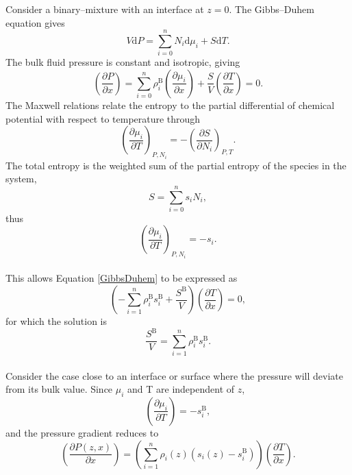 Consider a binary--mixture with an interface at $z=0$.
The Gibbs--Duhem equation gives
\begin{equation}
V \mathrm{d}P = \sum_{i=0}^{n} N_{i} \mathrm{d}\mu_{i} + S \mathrm{d}T.
\end{equation}
The bulk fluid pressure is constant and isotropic, giving
\begin{equation}
\label{GibbsDuhem}
\left( \frac{\partial P}{\partial x}\right) = \sum_{i=0}^{n} \rho_{i}^{\mathrm{B}} \left(\frac{\partial \mu_{i}}{\partial x}\right) + \frac{S}{V} \left( \frac{\partial T}{\partial x}\right) = 0.
\end{equation}
The Maxwell relations relate the entropy to the partial differential of chemical potential with respect to temperature through
\begin{equation}
\left( \frac{\partial\mu_{i}}{\partial T} \right)_{P,N_{i}} = - \left(\frac{\partial S}{\partial N_{i}}\right)_{P,T}.
\end{equation}
The total entropy is the weighted sum of the partial entropy of the species in the system, 
\begin{equation}
S = \sum_{i=0}^{n}s_{i}N_{i},
\end{equation}
thus
\begin{equation}
\left( \frac{\partial\mu_{i}}{\partial T} \right)_{P,N_{i}} = - s_{i}.
\end{equation}
\\
This allows Equation \ref{GibbsDuhem} to be expressed as
\begin{equation}
\left( - \sum_{i=1}^{n}\rho_{i}^{\mathrm{B}}s_{i}^{\mathrm{B}}+\frac{S^{\mathrm{B}}}{V}\right)\left(\frac{\partial T}{\partial x}\right) = 0,
\end{equation}
for which the solution is 
\begin{equation}
\frac{S^{\mathrm{B}}}{V} = \sum_{i=1}^{n}\rho_{i}^{\mathrm{B}}s_{i}^{\mathrm{B}}.
\end{equation}
\\
Consider the case close to an interface or surface where the pressure will deviate from its bulk value.
Since $\mu_{i}$ and T are independent of $z$,
\begin{equation}
\left(\frac{\partial \mu_{i}}{\partial T}\right) = - s_{i}^{\mathrm{B}},
\end{equation}
and the pressure gradient reduces to
\begin{equation}
\left(\frac{\partial P(z,x)}{\partial x}\right) = \left(\sum_{i=1}^{n}\rho_{i}(z)\left(s_{i}(z)-s_{i}^{\mathrm{B}}\right)\right)\left(\frac{\partial T}{\partial x}\right).
\label{PressGrad}
\end{equation}

